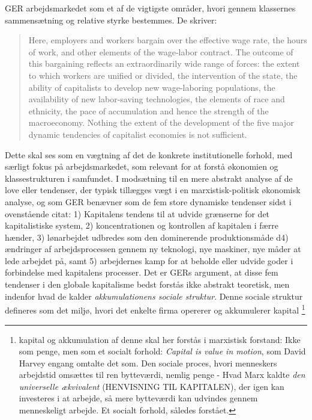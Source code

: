 GER arbejdsmarkedet som et af de vigtigste områder, hvori gennem klassernes sammensætning og relative styrke bestemmes. De skriver:
%
\begin{quote} \small %
Here, employers and workers bargain over the effective wage rate, the hours of work, and other elements of the wage-labor contract. The outcome of this bargaining reflects an extraordinarily wide range of forces: the extent to which workers are unified or divided, the intervention of the state, the ability of capitalists to develop new wage-laboring populations, the availability of new labor-saving technologies, the elements of race and ethnicity, the pace of accumulation and hence the strength of the macroeconomy. Nothing the extent of the development of the five major dynamic tendencies of capitalist economies is not sufficient. 
\end{quote}
%
Dette skal ses som en vægtning af det de konkrete institutionelle forhold, med særligt fokus på arbejdsmarkedet, som relevant for at forstå økonomien og klassestrukturen i samfundet. I modsætning til en mere abstrakt analyse af de love eller tendenser, der typisk tillægges vægt i en marxistisk-politisk økonomisk analyse, og som GER benævner som de fem store dynamiske tendenser sidst i ovenstående citat: \label{kapitalakkumulation} 1) Kapitalens tendens til at udvide grænserne for det kapitalistiske system, 2) koncentrationen og kontrollen af kapitalen i færre hænder, 3) lønarbejdet udbredes som den dominerende produktionsmåde d4) ændringer af arbejdsprocessen gennem ny teknologi, nye maskiner, nye måder at lede arbejdet på, samt  5) arbejdernes kamp for at beholde eller udvide goder i forbindelse med kapitalens processer. %
Det er GERs argument, at disse fem tendenser i den globale kapitalisme bedst forstås ikke abstrakt teoretisk, men indenfor hvad de kalder \emph{akkumulationens sociale struktur}. Denne sociale struktur defineres som det miljø, hvori det enkelte firma opererer og akkumulerer kapital%
%
\footnote{kapital og akkumulation af denne skal her forstås i marxistisk forstand: Ikke som penge, men som et socialt forhold: \emph{Capital is value in motion}, som David Harvey engang omtalte det som. Den sociale proces, hvori menneskers arbejdstid omsættes til ren bytteværdi, nemlig penge - Hvad Marx kaldte \emph{den universelle ækvivalent} (HENVISNING TIL KAPITALEN), der igen kan investeres i at arbejde, så mere bytteværdi kan udvindes gennem menneskeligt arbejde. Et socialt forhold, således forstået.}%
